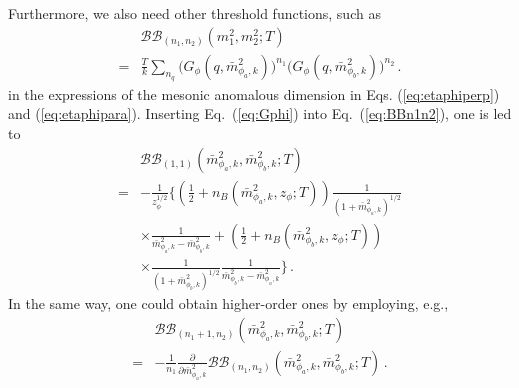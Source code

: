 \documentclass[%
reprint,
superscriptaddress,
showpacs,preprintnumbers,
 amsmath,amssymb,
 aps,
prd,
]{revtex4-1}
\def\Eq#1{Eq.~(\ref{#1})}
\begin{document}
Furthermore, we also need other threshold functions, such as
\begin{align}
  &\mathcal{BB}_{(n_1,n_2)}(m_1^2,m_2^2;T)\nonumber\\[2ex]
=&\frac{T}{k}\sum_{n_q}\Big(G_\phi(q,\bar{m}^{2}_{\phi_a,k})\Big)^{n_1} \Big(G_\phi(q,\bar{m}^{2}_{\phi_b,k})\Big)^{n_2}\,.\label{eq:BBn1n2}
\end{align}
in the expressions of the mesonic anomalous dimension in Eqs. (\ref{eq:etaphiperp}) and (\ref{eq:etaphipara}). Inserting \Eq{eq:Gphi} into \Eq{eq:BBn1n2}, one is led to
\begin{align}
  &\mathcal{BB}_{(1,1)}(\bar{m}^{2}_{\phi_a,k},\bar{m}^{2}_{\phi_b,k};T)\nonumber\\[2ex]
  =&-\frac{1}{z^{1/2}_{\phi}}\Bigg\{\left(\frac{1}{2}+n_B(\bar{m}^{2}_{\phi_a,k},z_\phi;T) \right)\frac{1}{(1+\bar{m}^{2}_{\phi_a,k})^{1/2}} \nonumber\\[2ex]
&\times \frac{1}{\bar{m}^{2}_{\phi_a,k}-\bar{m}^{2}_{\phi_b,k}}+\left( \frac{1}{2}+n_B(\bar{m}^{2}_{\phi_b,k},z_\phi;T) 
\right)\nonumber\\[2ex]
&\times \frac{1}{(1+\bar{m}^{2}_{\phi_b,k})^{1/2}}\frac{1}{\bar{m}^{2}_{\phi_b,k}-\bar{m}^{2}_{\phi_a,k}}\Bigg\}\,.\label{eq:BB11}
\end{align} 
In the same way, one could obtain higher-order ones by employing, e.g.,
\begin{align}
  &\mathcal{BB}_{(n_1+1,n_2)}(\bar{m}^{2}_{\phi_a,k},\bar{m}^{2}_{\phi_b,k};T)\nonumber\\[2ex]
  =&-\frac{1}{n_1}\frac{\partial}{\partial \bar{m}^{2}_{\phi_a,k}}\mathcal{BB}_{(n_1,n_2)}(\bar{m}^{2}_{\phi_a,k},\bar{m}^{2}_{\phi_b,k};T)\,.
\end{align}
\end{document}
